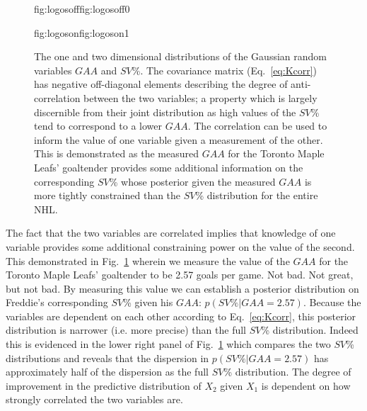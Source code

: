 \begin{figure}
  \centering
  \hspace{-0.9\hsize}%
  \begin{ocg}{fig:logosoff}{fig:logosoff}{0}%
  \end{ocg}%
  \begin{ocg}{fig:logoson}{fig:logoson}{1}%
  \end{ocg}
  \caption[Correlated Gaussian random variables in two dimensions.]
      {The one and two dimensional distributions of the Gaussian random
    variables $GAA$ and $SV$\%.
    The covariance matrix (Eq.~\ref{eq:Kcorr}) has negative off-diagonal
    elements describing the degree of anti-correlation between the two
    variables; a property which is largely discernible from their joint
    distribution as high values of the $SV$\% tend to correspond to a lower
    $GAA$. The correlation can be used to inform the value of one variable given a
    measurement of the other. This is demonstrated as the measured $GAA$ 
    for the Toronto Maple Leafs' goaltender 
    provides some
    additional information on the corresponding $SV$\% whose posterior given the
    measured $GAA$ is more tightly constrained than the $SV$\% distribution for
    the entire NHL.}
  \label{fig:corr2d}
\end{figure}

The fact that the two variables are
correlated implies that knowledge of one variable provides some additional constraining
power on the value of the second. This demonstrated in Fig.~\ref{fig:corr2d}
wherein we measure the value of the $GAA$ for the Toronto Maple Leafs' goaltender
to be 2.57 goals per game. Not bad. Not great, but not bad. By measuring
this value we can establish a posterior distribution on Freddie's corresponding
$SV$\% given his $GAA$: $p(SV\%|GAA=2.57)$. Because the variables are dependent
on each other according to Eq.~\ref{eq:Kcorr}, this posterior distribution is
narrower (i.e. more precise) than the full $SV$\% distribution. Indeed this is
evidenced in the lower right panel of Fig.~\ref{fig:corr2d} which compares the
two $SV$\% distributions and reveals that the dispersion in $p(SV\%|GAA=2.57)$
has approximately half of the dispersion as the full $SV$\% distribution. The degree
of improvement in the predictive distribution of $X_2$ given $X_1$ is dependent
on how strongly correlated the two variables are. \\

